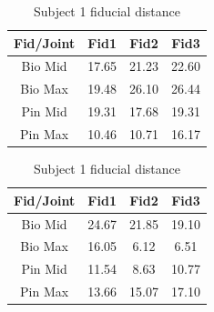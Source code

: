 \begin{table}
\centering
\begin{subtable}[c]{0.5\textwidth}
    \centering
        \begin{tabular}{||c | c c c||} 
         \hline
          Fid/Joint & Fid1 & Fid2 & Fid3  \\ [0.5ex] 
         \hline\hline
         Bio Mid & 17.65 & 21.23 & 22.60 \\ 
         \hline
         Bio Max & 19.48 & 26.10 & 26.44 \\
         \hline
         Pin Mid & 19.31 & 17.68 & 19.31 \\
         \hline
         Pin Max & 10.46 & 10.71 & 16.17 \\ [1ex] 
         \hline
        \end{tabular}
    \end{subtable}
        \begin{subtable}[c]{0.5\textwidth}
    \centering
    \begin{tabular}{||c | c c c||} 
         \hline
          Fid/Joint & Fid1 & Fid2 & Fid3  \\ [0.5ex] 
         \hline\hline
         Bio Mid & 24.67 & 21.85 & 19.10 \\ 
         \hline
         Bio Max & 16.05 & 6.12 & 6.51 \\
         \hline
         Pin Mid & 11.54 & 8.63 & 10.77 \\
         \hline
         Pin Max & 13.66 & 15.07 & 17.10 \\ [1ex] 
         \hline
        \end{tabular}
    \end{subtable}
\caption{Subject 1 fiducial distance}
\label{tab:sub1MRI}
\end{table}

